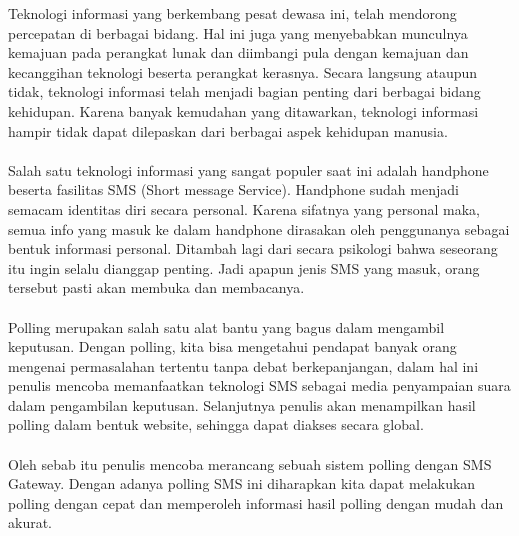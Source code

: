 \documentclass{jtetiproposalskripsi}
\begin{document}
\cover

\approvalpage


\begin{abstractind}
Teknologi informasi yang berkembang pesat dewasa ini, telah mendorong percepatan di berbagai bidang. Hal ini juga yang menyebabkan munculnya kemajuan pada perangkat lunak dan diimbangi pula dengan kemajuan dan kecanggihan teknologi beserta perangkat kerasnya. Secara langsung ataupun tidak, teknologi informasi telah menjadi bagian penting dari berbagai bidang kehidupan. Karena banyak kemudahan yang ditawarkan, teknologi informasi hampir tidak dapat dilepaskan dari berbagai aspek kehidupan manusia.
\paragraph{}
Salah satu teknologi informasi yang sangat populer saat ini adalah handphone beserta fasilitas SMS (Short message Service). Handphone sudah menjadi semacam identitas diri secara personal. Karena sifatnya yang personal maka, semua info yang masuk ke dalam handphone dirasakan oleh penggunanya sebagai bentuk informasi personal. Ditambah lagi dari secara psikologi bahwa seseorang itu ingin selalu  dianggap penting. Jadi apapun jenis SMS yang masuk, orang tersebut pasti akan membuka dan membacanya. 
\paragraph{}
Polling merupakan salah satu alat bantu yang bagus dalam mengambil keputusan. Dengan polling, kita bisa mengetahui pendapat banyak orang mengenai  permasalahan tertentu tanpa debat berkepanjangan, dalam hal ini penulis mencoba  memanfaatkan teknologi SMS sebagai media penyampaian suara dalam pengambilan  keputusan. Selanjutnya penulis akan menampilkan hasil polling dalam bentuk website, sehingga dapat diakses secara global. 
\paragraph{}
Oleh sebab itu penulis mencoba merancang sebuah sistem polling dengan SMS Gateway. Dengan adanya polling SMS ini diharapkan kita dapat melakukan polling dengan cepat dan memperoleh informasi hasil polling dengan mudah dan akurat.

\end{abstractind}
\end{document}
